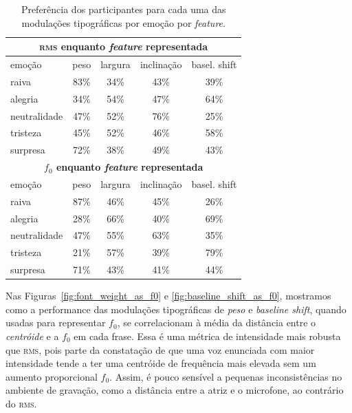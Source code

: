 \documentclass[11pt]{article}
\begin{document}
\begin{table}
    \begin{tabular*}{\linewidth}{lcccc}
        \toprule
        \multicolumn{5}{c}{ \textbf{\textsc{rms} enquanto {\itshape feature} representada} }     \\
        \midrule
        \small{emoção} & \small{peso} & \small{largura} & \small{inclinação} & \small{basel. shift}  \\
        \midrule
        raiva           & 83\% & 34\% & 43\% & 39\% \\
        alegria         & 34\% & 54\% & 47\% & 64\% \\
        neutralidade    & 47\% & 52\% & \cellcolor[HTML]{9ef7cd}76\% & 25\% \\
        tristeza        & 45\% & 52\% & 46\% & 58\% \\
        surpresa        & \cellcolor[HTML]{9ef7cd}72\% & 38\% & 49\% & 43\% \\
        \midrule
        \multicolumn{5}{c}{ \textbf{$f_0$ enquanto {\itshape feature} representada} }      \\
        \midrule
        \small{emoção} & \small{peso} & \small{largura} & \small{inclinação} & \small{basel. shift}  \\
        \midrule
        raiva           & \cellcolor[HTML]{9ef7cd}87\% & 46\% & 45\% & 26\% \\
        alegria         & 28\% & 66\% & 40\% & \cellcolor[HTML]{9ef7cd}69\% \\
        neutralidade    & 47\% & 55\% & 63\% & 35\% \\
        tristeza        & 21\% & 57\% & 39\% & \cellcolor[HTML]{9ef7cd}79\% \\
        surpresa        & 71\% & 43\% & 41\% & 44\% \\
        \bottomrule
    \end{tabular*}
    \caption{Preferência dos participantes para cada uma das modulações tipográficas por emoção por {\itshape feature}. }
    \label{tab:type_perf}
\end{table}
  
  Nas Figuras~\ref{fig:font_weight_as_f0} e \ref{fig:baseline_shift_as_f0}, mostramos como a performance das modulações tipográficas de {\itshape peso} e {\itshape baseline shift}, quando usadas para representar $f_0$, se correlacionam à média da distância entre o {\itshape centróide} e a $f_0$ em cada frase. Essa é uma métrica de intensidade mais robusta que \textsc{rms}, pois parte da constatação de que uma voz enunciada com maior intensidade tende a ter uma centróide de frequência mais elevada sem um aumento proporcional $f_0$. Assim, é pouco sensível a pequenas inconsistências no ambiente de gravação, como a distância entre a atriz e o microfone, ao contrário do \textsc{rms}.
  
\end{document}
